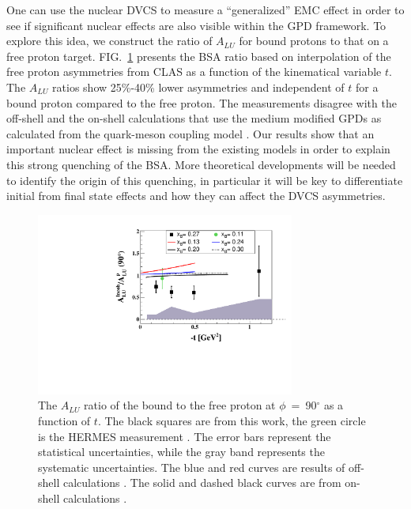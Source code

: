 \documentclass[twocolumn,nofootinbib,showpacs,prl,superscriptaddress,secnumarabic,amssymb,nobibnotes,aps,floatfix]{revtex4}
\begin{document}
One can use the nuclear DVCS to measure a ``generalized'' EMC effect in order 
to see if significant nuclear effects are also visible within the GPD 
framework.  To explore this idea, we construct the ratio of $A_{LU}$ for bound 
protons to that on a free proton target. 
FIG.~\ref{fig:incoh_EMC_ratio_ALU_proton} presents the BSA ratio based on 
interpolation of the free proton asymmetries from CLAS \cite{Girod:2007aa} as a 
function of the kinematical variable $t$. The $A_{LU}$ ratios show 25\%-40\% 
lower asymmetries and independent of $t$ for a bound proton compared to the 
free proton. The measurements disagree with the off-shell \cite{simonetta_2} 
and the on-shell calculations that use the medium modified GPDs as calculated 
from the quark-meson coupling model \cite{Guzey:2008fe}. Our results show that 
an important nuclear effect is missing from the existing models in order to 
explain this strong quenching of the BSA. More theoretical developments will be 
needed to identify the origin of this quenching, in particular it will be key 
to differentiate initial from final state effects and how they can affect the 
DVCS asymmetries.

\begin{figure}[tb]
\centering
\includegraphics[width=8.5cm]{figs/ALU_ratioInc_t_shortscenrario-without-error-onX.pdf}
\caption{ The $A_{LU}$ ratio of the bound to the free proton at 
   $\phi$~=~90$^{\circ}$ as a function of $t$. The black squares are from this 
   work, the green circle is the HERMES measurement \cite{Airapetian:2009cga}.  
   The error bars represent the statistical uncertainties, while the gray band 
   represents the systematic uncertainties. The blue and red curves are results 
   of off-shell calculations \cite{simonetta_2}. The solid and dashed black 
   curves are from on-shell calculations \cite{Guzey:2008fe}.} 
   \label{fig:incoh_EMC_ratio_ALU_proton}
\end{figure}
\end{document}
